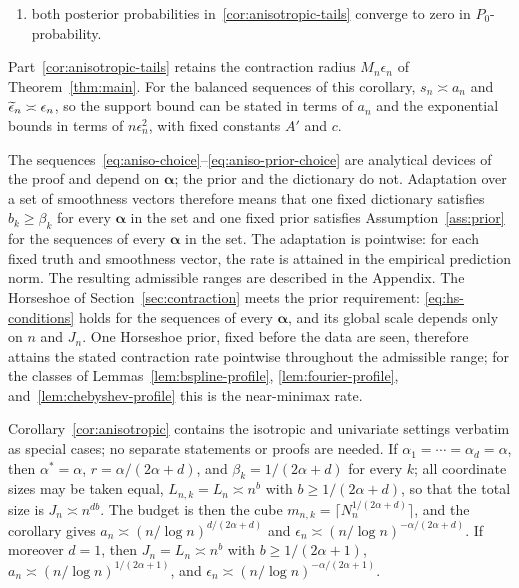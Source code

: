 \begin{corollary}{\thecorollary}
\begin{enumerate}[label=(\roman*)]
\begin{align}
E_0\,\Pi_n\left(
\|f-f_0\|_{2,n}>M_n\epsilon_n
\,\middle|\,Y^{(n)}
\right)
&\leq6e^{-c n\epsilon_n^2}, \label{eq:cor1-L1}\\
E_0\,\Pi_n\left(
\#\{j:|\theta_j|>\delta_n\}>A'a_n
\,\middle|\,Y^{(n)}
\right)
&\leq2e^{-c n\epsilon_n^2}; \label{eq:cor1-support}
\end{align}
\item both posterior probabilities in~\ref{cor:anisotropic-tails} converge to zero in $P_0$-probability.
\end{enumerate}
\end{corollary}

Part~\ref{cor:anisotropic-tails} retains the contraction radius $M_n\epsilon_n$ of Theorem~\ref{thm:main}. For the balanced sequences of this corollary, $s_n\asymp a_n$ and $\widetilde{\epsilon}_n\asymp\epsilon_n$, so the support bound can be stated in terms of $a_n$ and the exponential bounds in terms of $n\epsilon_n^2$, with fixed constants $A'$ and $c$.

The sequences~\eqref{eq:aniso-choice}--\eqref{eq:aniso-prior-choice} are analytical devices of the proof and depend on $\boldsymbol\alpha$; the prior and the dictionary do not. Adaptation over a set of smoothness vectors therefore means that one fixed dictionary satisfies $b_k\geq\beta_k$ for every $\boldsymbol\alpha$ in the set and one fixed prior satisfies Assumption~\ref{ass:prior} for the sequences of every $\boldsymbol\alpha$ in the set. The adaptation is pointwise: for each fixed truth and smoothness vector, the rate is attained in the empirical prediction norm. The resulting admissible ranges are described in the Appendix. The Horseshoe of Section~\ref{sec:contraction} meets the prior requirement: \eqref{eq:hs-conditions} holds for the sequences of every $\boldsymbol\alpha$, and its global scale depends only on $n$ and $J_n$. One Horseshoe prior, fixed before the data are seen, therefore attains the stated contraction rate pointwise throughout the admissible range; for the classes of Lemmas~\ref{lem:bspline-profile}, \ref{lem:fourier-profile}, and~\ref{lem:chebyshev-profile} this is the near-minimax rate.

Corollary~\ref{cor:anisotropic} contains the isotropic and univariate settings verbatim as special cases; no separate statements or proofs are needed. If $\alpha_1=\cdots=\alpha_d=\alpha$, then $\alpha^*=\alpha$, $r=\alpha/(2\alpha+d)$, and $\beta_k=1/(2\alpha+d)$ for every $k$; all coordinate sizes may be taken equal, $L_{n,k}=L_n\asymp n^b$ with $b\geq1/(2\alpha+d)$, so that the total size is $J_n\asymp n^{db}$. The budget is then the cube $m_{n,k}=\lceil N_n^{1/(2\alpha+d)}\rceil$, and the corollary gives $a_n\asymp(n/\log n)^{d/(2\alpha+d)}$ and $\epsilon_n\asymp(n/\log n)^{-\alpha/(2\alpha+d)}$. If moreover $d=1$, then $J_n=L_n\asymp n^b$ with $b\geq1/(2\alpha+1)$, $a_n\asymp(n/\log n)^{1/(2\alpha+1)}$, and $\epsilon_n\asymp(n/\log n)^{-\alpha/(2\alpha+1)}$.

